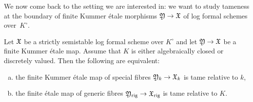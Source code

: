 We now come back to the setting we are interested in:
we want to study tameness at the boundary of finite Kummer étale morphisms ${\mathfrak{Y}} \to {\mathfrak{X}}$ of log formal schemes over~$K^\circ$.

\begin{prop} \label{prop:tameness-comparison}
    Let ${\mathfrak{X}}$ be a strictly semistable log formal scheme over $K^\circ$ and let ${\mathfrak{Y}}\to{\mathfrak{X}}$ be a finite Kummer \'etale map.  Assume that $K$ is either algebraically closed or discretely valued. 
 Then the following are equivalent:
    \begin{enumerate}[(a)]
        \item the finite Kummer \'etale map of special fibres ${\mathfrak{Y}}_k\to {\mathfrak{X}}_k$ is tame relative to $k$,
    
        \item the finite \'etale map of generic fibres ${\mathfrak{Y}}_{\rm rig}\to{\mathfrak{X}}_{\rm rig}$ is tame relative to $K$.
    \end{enumerate}
\end{prop}

